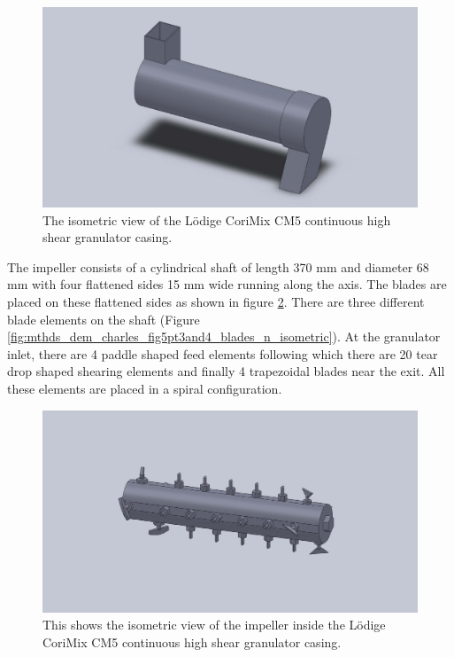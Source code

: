 \documentclass[preprint,11pt,authoryear]{elsarticle}
\begin{document}
\begin{figure}
\centering
\includegraphics[scale=0.2]{shell_final_pic.pdf}
\caption{The isometric view of the L\"{o}dige CoriMix CM5 continuous high shear granulator casing.}
\label{fig:mthdsDemCharlesGranShell}
\end{figure}

The impeller consists of a cylindrical shaft of length 370 mm and diameter 68 mm with four 
flattened sides 15 mm wide running along the axis. The blades are placed on these flattened sides as 
shown in figure \ref{fig:mthds_dem_charles_impeller}. There are three different blade elements on the 
shaft (Figure \ref{fig:mthds_dem_charles_fig5pt3and4_blades_n_isometric}). At the granulator inlet, 
there are 4 paddle shaped feed elements following which there are 20 tear drop shaped shearing 
elements  and finally 4 trapezoidal blades near the exit. All these elements are placed in 
a spiral configuration. 

\begin{figure}
\centering
\includegraphics[scale=0.15]{impeller_final_pic.pdf}
\caption{This shows the isometric view of the impeller inside the L\"{o}dige CoriMix CM5 continuous high shear granulator casing.}
\label{fig:mthds_dem_charles_impeller}
\end{figure}    
\end{document}
